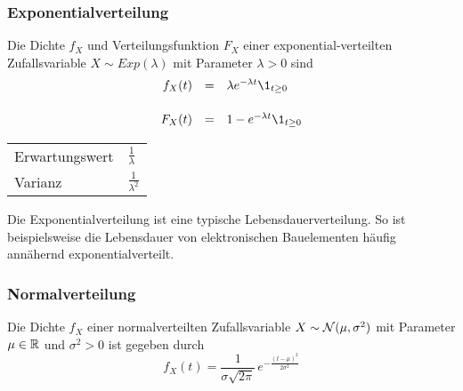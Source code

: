 

\subsubsection{Exponentialverteilung}

Die Dichte \(f_X\) und Verteilungsfunktion \(F_X\) einer exponential-verteilten Zufallsvariable \(X \sim Exp(\lambda)\) mit Parameter \(\lambda > 0\) sind
\[
	\begin{array}{rcl}

		f_X(t) & = & \lambda e^{-\lambda t} \1_{t \geq 0}

		\\[1.5em]

		F_X(t) & = & 1 - e^{-\lambda t} \1_{t \geq 0}
	\end{array}
\]

\begin{highlight}
	\begin{tabular}{l@{ : }l}
		Erwartungswert & \(\frac{1}{\lambda}\)   \\
		Varianz        & \(\frac{1}{\lambda^2}\)
	\end{tabular}
\end{highlight}

\begin{example}[Lebensdauer]
	Die Exponentialverteilung ist eine typische Lebensdauerverteilung.
	So ist beispielsweise die Lebensdauer von elektronischen Bauelementen häufig annähernd exponentialverteilt.
\end{example}




\subsubsection{Normalverteilung}

Die Dichte \(f_X\) einer normalverteilten Zufallsvariable \(X \sim \mathcal{N}(\mu,\sigma^2)\) mit Parameter \(\mu \in \mathbb{R}\) und \(\sigma^2 > 0\) ist gegeben durch
\[
	f_X(t) =
	\frac{1}{\sigma\sqrt{2\pi}} \, e^{-\frac{(t-\mu)^2}{2\sigma^2}}
\]

